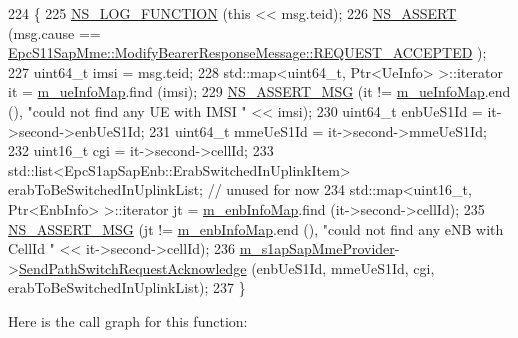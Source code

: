 \begin{DoxyCode}
224 \{
225   \hyperlink{log-macros-disabled_8h_a90b90d5bad1f39cb1b64923ea94c0761}{NS\_LOG\_FUNCTION} (\textcolor{keyword}{this} << msg.teid);
226   \hyperlink{assert_8h_a6dccdb0de9b252f60088ce281c49d052}{NS\_ASSERT} (msg.cause == 
      \hyperlink{structns3_1_1EpcS11SapMme_1_1ModifyBearerResponseMessage_a0f5caf9b54d24e8298ba8878ef1f773ca13e4573acd6716004d421a969b43e50c}{EpcS11SapMme::ModifyBearerResponseMessage::REQUEST\_ACCEPTED}
      );
227   uint64\_t imsi = msg.teid;
228   std::map<uint64\_t, Ptr<UeInfo> >::iterator it = \hyperlink{classns3_1_1EpcMmeApplication_a1f33ca8847355e961f6c290dfb6e16e6}{m\_ueInfoMap}.find (imsi);
229   \hyperlink{assert_8h_aff5ece9066c74e681e74999856f08539}{NS\_ASSERT\_MSG} (it != \hyperlink{classns3_1_1EpcMmeApplication_a1f33ca8847355e961f6c290dfb6e16e6}{m\_ueInfoMap}.end (), \textcolor{stringliteral}{"could not find any UE with IMSI "} << 
      imsi);
230   uint64\_t enbUeS1Id = it->second->enbUeS1Id;
231   uint64\_t mmeUeS1Id = it->second->mmeUeS1Id;
232   uint16\_t cgi = it->second->cellId;
233   std::list<EpcS1apSapEnb::ErabSwitchedInUplinkItem> erabToBeSwitchedInUplinkList; \textcolor{comment}{// unused for now}
234   std::map<uint16\_t, Ptr<EnbInfo> >::iterator jt = \hyperlink{classns3_1_1EpcMmeApplication_a6c49c825306fc4923aef0352a1fab029}{m\_enbInfoMap}.find (it->second->cellId);
235   \hyperlink{assert_8h_aff5ece9066c74e681e74999856f08539}{NS\_ASSERT\_MSG} (jt != \hyperlink{classns3_1_1EpcMmeApplication_a6c49c825306fc4923aef0352a1fab029}{m\_enbInfoMap}.end (), \textcolor{stringliteral}{"could not find any eNB with CellId "} 
      << it->second->cellId);
236   \hyperlink{classns3_1_1EpcMmeApplication_a22aa4b3242125c65e94ce651970be4c1}{m\_s1apSapMmeProvider}->\hyperlink{classns3_1_1EpcS1apSapMmeProvider_a5795491210577b40be1f96d071e0689b}{SendPathSwitchRequestAcknowledge}
       (enbUeS1Id, mmeUeS1Id, cgi, erabToBeSwitchedInUplinkList);
237 \}
\end{DoxyCode}


Here is the call graph for this function\+:


